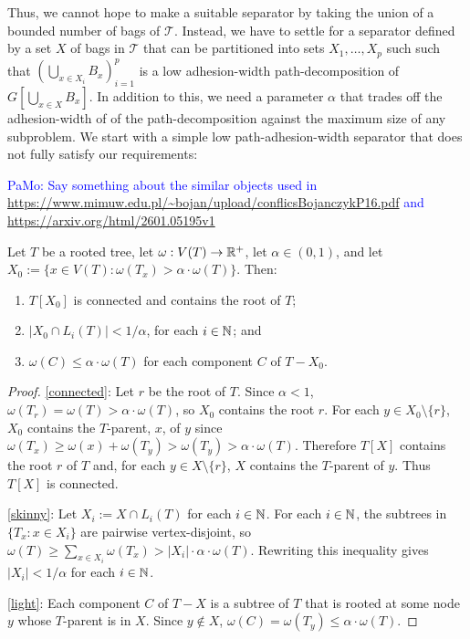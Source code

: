 \documentclass{patmorin}
\renewcommand{\ge}{\geqslant}
\renewcommand{\le}{\leqslant}
\newcommand{\pat}[1]{\textcolor{Blue}{PaMo: #1}}
\begin{document}
  Thus, we cannot hope to make a suitable separator by taking the union of a bounded number of bags of $\mathcal{T}$.
  Instead, we have to settle for a separator defined by a set $X$ of bags in $\mathcal{T}$ that can be partitioned into sets $X_1,\ldots,X_p$ such such that $(\bigcup_{x\in X_i}B_{x})_{i=1}^p$ is a low adhesion-width path-decomposition of $G[\bigcup_{x\in X} B_x]$.  In addition to this, we need a parameter $\alpha$ that trades off the adhesion-width of of the path-decomposition against the maximum size of any subproblem.    We start with a simple low path-adhesion-width separator that does not fully satisfy our requirements:


  \pat{Say something about the similar objects used in \url{https://www.mimuw.edu.pl/~bojan/upload/conflicsBojanczykP16.pdf} and \url{https://arxiv.org/html/2601.05195v1}}


  \begin{lem}\label{low_pathwidth_separator}
    Let $T$ be a rooted tree, let $\omega:V(T)\to\mathbb{R}^+$, let $\alpha\in(0,1)$, and let $X_0:=\{x\in V(T):\omega(T_x)>\alpha\cdot\omega(T)\}$.  Then:
    \begin{enumerate}[nosep,nolistsep,label=(\alph*)]
      \item\label{connected} $T[X_0]$ is connected and contains the root of $T$;
      \item\label{skinny} $|X_0\cap L_i(T)|< 1/\alpha$, for each $i\in\mathbb{N}$; and
      \item\label{light} $\omega(C)\le \alpha\cdot\omega(T)$ for each component $C$ of $T-X_0$.
    \end{enumerate}
  \end{lem}

  \begin{proof}
    \noindent\ref{connected}:  Let $r$ be the root of $T$.  Since $\alpha <1$, $\omega(T_r)=\omega(T)>\alpha\cdot\omega(T)$, so $X_0$ contains the root $r$.  For each $y\in X_0\setminus\{r\}$, $X_0$ contains the $T$-parent, $x$, of $y$ since $\omega(T_x)\ge \omega(x)+\omega(T_y)>\omega(T_y)>\alpha\cdot\omega(T)$.  Therefore $T[X]$ contains the root $r$ of $T$ and, for each $y\in X\setminus\{r\}$, $X$ contains the $T$-parent of $y$. Thus $T[X]$ is connected.

    \noindent\ref{skinny}:
    Let $X_i:=X\cap L_i(T)$ for each $i\in\mathbb{N}$.  For each $i\in\mathbb{N}$, the subtrees in $\{T_x:x\in X_i\}$ are pairwise vertex-disjoint, so $\omega(T) \ge \sum_{x\in X_i} \omega(T_x)> |X_i|\cdot\alpha\cdot\omega(T)$.  Rewriting this inequality gives $|X_i|<1/\alpha$ for each $i\in\mathbb{N}$.

    \noindent\ref{light}:
    Each component $C$ of $T-X$ is a subtree of $T$ that is rooted at some node $y$ whose $T$-parent is in $X$.  Since  $y\not\in X$, $\omega(C)=\omega(T_y)\le \alpha\cdot\omega(T)$.
  \end{proof}
\end{document}
